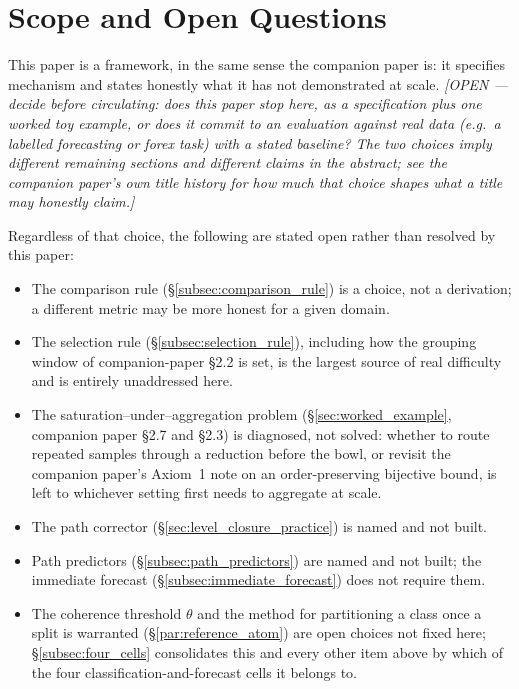 \documentclass[12pt, a4paper]{article}
\begin{document}
\section{Scope and Open Questions}
\label{sec:scope}

This paper is a framework, in the same sense the companion paper is:
it specifies mechanism and states honestly what it has not
demonstrated at scale. \emph{[OPEN --- decide before circulating: does
this paper stop here, as a specification plus one worked toy example,
or does it commit to an evaluation against real data (e.g.\ a labelled
forecasting or forex task) with a stated baseline? The two choices
imply different remaining sections and different claims in the
abstract; see the companion paper's own title history for how much
that choice shapes what a title may honestly claim.]}

Regardless of that choice, the following are stated open rather than
resolved by this paper:

\begin{itemize}
\item The comparison rule (\S\ref{subsec:comparison_rule}) is a
      choice, not a derivation; a different metric may be more honest
      for a given domain.
\item The selection rule (\S\ref{subsec:selection_rule}), including
      how the grouping window of companion-paper \S2.2 is set, is the
      largest source of real difficulty and is entirely unaddressed
      here.
\item The saturation--under--aggregation problem
      (\S\ref{sec:worked_example}, companion paper \S2.7 and \S2.3) is
      diagnosed, not solved: whether to route repeated samples through
      a reduction before the bowl, or revisit the companion paper's
      Axiom~1 note on an order-preserving bijective bound, is left to
      whichever setting first needs to aggregate at scale.
\item The path corrector (\S\ref{sec:level_closure_practice}) is named
      and not built.
\item Path predictors (\S\ref{subsec:path_predictors}) are named and
      not built; the immediate forecast
      (\S\ref{subsec:immediate_forecast}) does not require them.
\item The coherence threshold $\theta$ and the method for
      partitioning a class once a split is warranted
      (\S\ref{par:reference_atom}) are open choices not fixed here;
      \S\ref{subsec:four_cells} consolidates this and every other item
      above by which of the four classification-and-forecast cells it
      belongs to.
\end{itemize}
\end{document}
